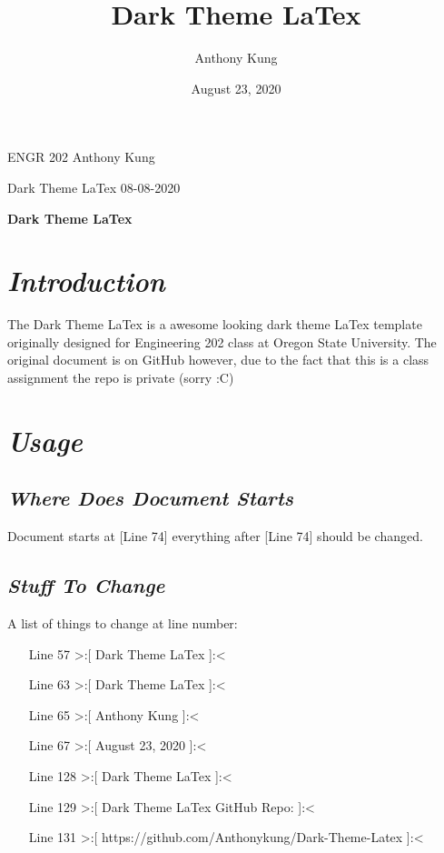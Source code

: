 \documentclass{article}
\title{Dark Theme LaTex}
\author{
  Anthony Kung
}
\date{August 23, 2020}
\begin{document}
\selectfont

ENGR 202
\hfill
Anthony Kung

Dark Theme LaTex
\hfill
08-08-2020

\begin{center}
  \large\textbf{Dark Theme LaTex}
  \\
\end{center}

\tableofcontents

\setlength{\parskip}{1em}

\section{\textbf{\textit{Introduction}}}

The Dark Theme LaTex is a awesome looking dark theme LaTex template originally designed for Engineering 202 class at Oregon State University. The original document is on GitHub however, due to the fact that this is a class assignment the repo is private (sorry :C)

\section{\textbf{\textit{Usage}}}

\subsection{\textbf{\textit{Where Does Document Starts}}}

Document starts at [Line 74] everything after [Line 74] should be changed.

\subsection{\textbf{\textit{Stuff To Change}}}

A list of things to change at line number:

\begin{enumerate}
  \item [Line 57] >:[ Dark Theme LaTex ]:<
  \item [Line 63] >:[ Dark Theme LaTex ]:<
  \item [Line 65] >:[ Anthony Kung ]:<
  \item [Line 67] >:[ August 23, 2020 ]:<
  \item [Line 128] >:[ Dark Theme LaTex ]:<
  \item [Line 129] >:[ Dark Theme LaTex GitHub Repo: ]:<
  \item [Line 131] >:[ https://github.com/Anthonykung/Dark-Theme-Latex ]:<
\end{enumerate}
\end{document}
